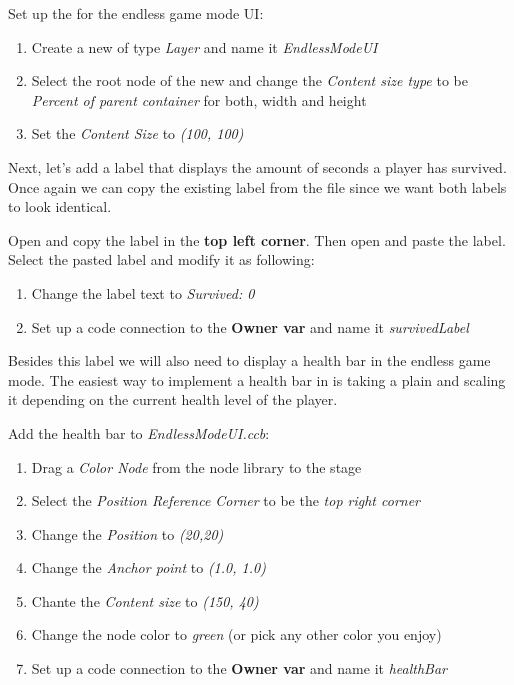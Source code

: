 \begin{leftbar}
Set up the \ccbfile{} for the endless game mode UI:
\begin{enumerate}
  \item Create a new \ccbfile{} of type \textit{Layer} and name it
\textit{EndlessModeUI}
\item Select the root node of the new \ccbfile{} and change
the \textit{Content size type} to be \textit{Percent of parent container} for
both, width and height
\item Set the \textit{Content Size} to \textit{(100, 100)}
\end{enumerate}
\end{leftbar}
Next, let's add a label that displays the amount of seconds a player has
survived. Once again we can copy the existing label from the
 file since we want both labels to look identical.
\begin{leftbar}

Open  and copy the label in the \textbf{top left
corner}. Then open  and paste the label. Select
the pasted label and modify it as following:
\begin{enumerate}
  \item Change the label text to \textit{Survived: 0}
  \item Set up a code connection to the \textbf{Owner var} and name it \textit{survivedLabel}
\end{enumerate}
\end{leftbar}

Besides this label we will also need to display a health bar in the endless game
mode. The easiest way to implement a health bar in \cocos{} is taking a plain
 and scaling it depending on the current health level
of the player.

\begin{leftbar}
Add the health bar to \textit{EndlessModeUI.ccb}:
\begin{enumerate}
  \item Drag a \textit{Color Node} from the node library to the stage
  \item Select the \textit{Position Reference Corner} to be the \textit{top
  right corner}
  \item Change the \textit{Position} to \textit{(20,20)}
  \item Change the \textit{Anchor point} to \textit{(1.0, 1.0)}
  \item Chante the \textit{Content size} to \textit{(150, 40)}
  \item Change the node color to \textit{green} (or pick any other color you
  enjoy)
  \item Set up a code connection to the \textbf{Owner var} and name it \textit{healthBar}
\end{enumerate}
\end{leftbar}

